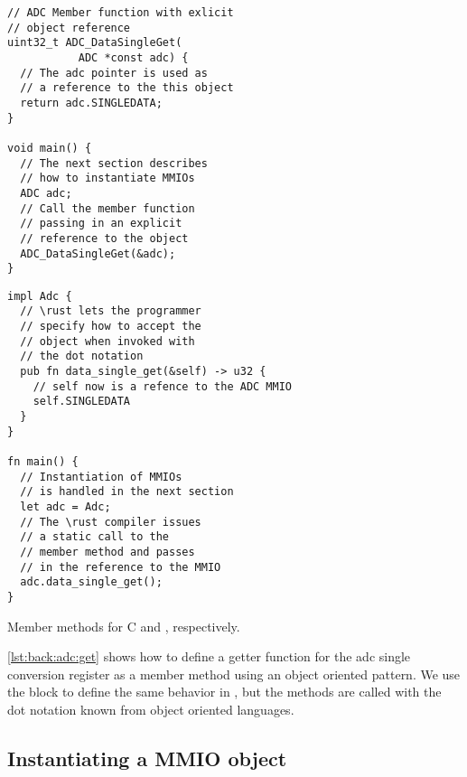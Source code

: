 \begin{listing}[H]
  \centering
  \begin{minipage}{0.47\textwidth}
  \begin{listing}
      \begin{verbatim}
// ADC Member function with exlicit
// object reference
uint32_t ADC_DataSingleGet(
           ADC *const adc) {
  // The adc pointer is used as
  // a reference to the this object
  return adc.SINGLEDATA;
}

void main() {
  // The next section describes
  // how to instantiate MMIOs
  ADC adc;
  // Call the member function
  // passing in an explicit
  // reference to the object
  ADC_DataSingleGet(&adc);
}
      \end{verbatim}
  \end{listing}
  \end{minipage}
  \hfill
  \begin{minipage}{0.47\textwidth}
  \begin{listing}
      \begin{verbatim}
impl Adc {
  // \rust lets the programmer
  // specify how to accept the
  // object when invoked with
  // the dot notation
  pub fn data_single_get(&self) -> u32 {
    // self now is a refence to the ADC MMIO
    self.SINGLEDATA
  }
}

fn main() {
  // Instantiation of MMIOs
  // is handled in the next section
  let adc = Adc;
  // The \rust compiler issues
  // a static call to the
  // member method and passes
  // in the reference to the MMIO
  adc.data_single_get();
}
      \end{verbatim}
  \end{listing}
  \end{minipage}
  \caption{Member methods for C and \rust, respectively.}
  \label{lst:back:adc:get}

\end{listing}

\autoref{lst:back:adc:get} shows how to define a getter function for the \gls{adc} single conversion register as a member method using an object oriented pattern.
We use the  block to define the same behavior in \rust, but the methods are called with the dot notation known from object oriented languages.

\subsection{Instantiating a MMIO object}

